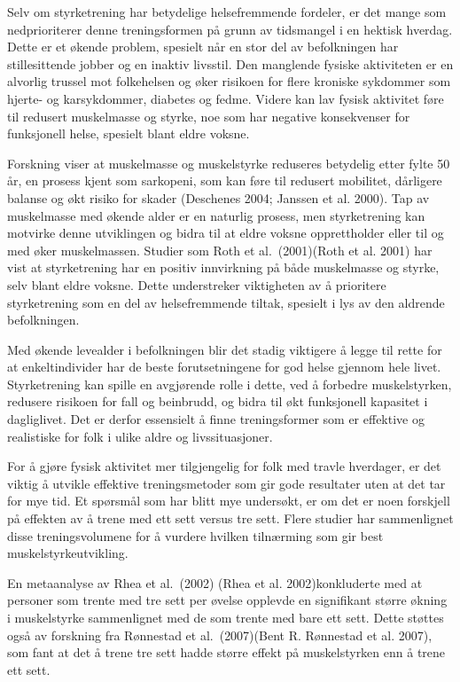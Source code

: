 \documentclass[
  letterpaper,
  DIV=11,
  numbers=noendperiod]{scrreprt}
\begin{document}
Selv om styrketrening har betydelige helsefremmende fordeler, er det
mange som nedprioriterer denne treningsformen på grunn av tidsmangel i
en hektisk hverdag. Dette er et økende problem, spesielt når en stor del
av befolkningen har stillesittende jobber og en inaktiv livsstil. Den
manglende fysiske aktiviteten er en alvorlig trussel mot folkehelsen og
øker risikoen for flere kroniske sykdommer som hjerte- og karsykdommer,
diabetes og fedme. Videre kan lav fysisk aktivitet føre til redusert
muskelmasse og styrke, noe som har negative konsekvenser for funksjonell
helse, spesielt blant eldre voksne.

Forskning viser at muskelmasse og muskelstyrke reduseres betydelig etter
fylte 50 år, en prosess kjent som sarkopeni, som kan føre til redusert
mobilitet, dårligere balanse og økt risiko for skader (Deschenes 2004;
Janssen et al. 2000). Tap av muskelmasse med økende alder er en naturlig
prosess, men styrketrening kan motvirke denne utviklingen og bidra til
at eldre voksne opprettholder eller til og med øker muskelmassen.
Studier som Roth et al.~(2001)(Roth et al. 2001) har vist at
styrketrening har en positiv innvirkning på både muskelmasse og styrke,
selv blant eldre voksne. Dette understreker viktigheten av å prioritere
styrketrening som en del av helsefremmende tiltak, spesielt i lys av den
aldrende befolkningen.

Med økende levealder i befolkningen blir det stadig viktigere å legge
til rette for at enkeltindivider har de beste forutsetningene for god
helse gjennom hele livet. Styrketrening kan spille en avgjørende rolle i
dette, ved å forbedre muskelstyrken, redusere risikoen for fall og
beinbrudd, og bidra til økt funksjonell kapasitet i dagliglivet. Det er
derfor essensielt å finne treningsformer som er effektive og realistiske
for folk i ulike aldre og livssituasjoner.

For å gjøre fysisk aktivitet mer tilgjengelig for folk med travle
hverdager, er det viktig å utvikle effektive treningsmetoder som gir
gode resultater uten at det tar for mye tid. Et spørsmål som har blitt
mye undersøkt, er om det er noen forskjell på effekten av å trene med
ett sett versus tre sett. Flere studier har sammenlignet disse
treningsvolumene for å vurdere hvilken tilnærming som gir best
muskelstyrkeutvikling.

En metaanalyse av Rhea et al.~(2002) (Rhea et al. 2002)konkluderte med
at personer som trente med tre sett per øvelse opplevde en signifikant
større økning i muskelstyrke sammenlignet med de som trente med bare ett
sett. Dette støttes også av forskning fra Rønnestad et al.~(2007)(Bent
R. Rønnestad et al. 2007), som fant at det å trene tre sett hadde større
effekt på muskelstyrken enn å trene ett sett.
\end{document}
